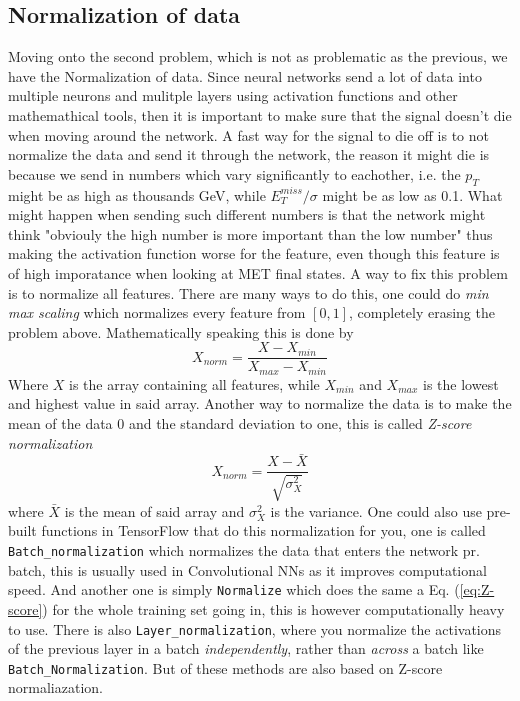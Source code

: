 \documentclass[14pt, a4paper]{book}
\begin{document}
\subsection{Normalization of data}\label{sec:normie_NN}
Moving onto the second problem, which is not as problematic as the previous, we have the Normalization of data. Since neural networks send a lot of data into multiple neurons and mulitple layers using activation functions and other mathemathical tools, then it is important to make sure that the signal doesn't die when moving around the network. A fast way for the signal to die off is to not normalize the data and send it through the network, the reason it might die is because we send in numbers which vary significantly to eachother, i.e. the $p_{T}$ might be as high as thousands GeV, while $E_T^{miss}/\sigma$ might be as low as 0.1. What might happen when sending such different numbers is that the network might think "obviouly the high number is more important than the low number" thus making the activation function worse for the feature, even though this feature is of high imporatance when looking at MET final states.
A way to fix this problem is to normalize all features. There are many ways to do this, one could do \textit{min max scaling} which normalizes every feature from $[0,1]$, completely erasing the problem above. Mathematically speaking this is done by
\begin{equation}\label{eq:minmax}
   X_{norm} = \frac{X - X_{min}}{X_{max}-X_{min}}
\end{equation}
Where $X$ is the array containing all features, while $X_{min}$ and $X_{max}$ is the lowest and highest value in said array. Another way to normalize the data is to make the mean of the data 0 and the standard deviation to one, this is called \textit{Z-score normalization}
\begin{equation}\label{eq:Z-score}
   X_{norm} = \frac{X - \bar{X}}{\sqrt{\sigma_X^2}}
\end{equation}
where $\bar{X}$ is the mean of said array and $\sigma_X^2$ is the variance. One could also use pre-built functions in TensorFlow that do this normalization for you, one is called \verb|Batch_normalization| which normalizes the data that enters the network pr. batch, this is usually used in Convolutional NNs as it improves computational speed. 
And another one is simply \verb|Normalize| which does the same a Eq. (\ref{eq:Z-score}) for the whole training set going in, this is however computationally heavy to use. There is also \verb|Layer_normalization|, where you normalize the activations of the previous layer in a batch \textit{independently}, rather than \textit{across} a batch like \verb|Batch_Normalization|. But of these methods are also based on Z-score normaliazation. \\
\end{document}
